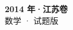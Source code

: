 \documentclass[zihao=-4, a4paper]{ctexart}
\begin{document}
\begin{center}
  {\Large\bfseries 2014 年·江苏卷}\\[4pt]
  {\large 数学 · 试题版}
\end{center}
\medskip
{}

\end{document}
